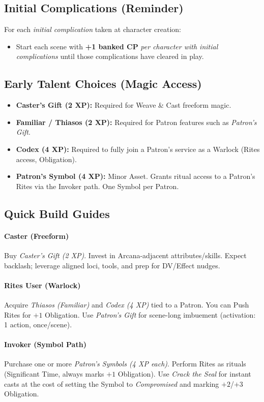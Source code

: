 \subsection{Initial Complications (Reminder)}
For each \emph{initial complication} taken at character creation:
\begin{itemize}
  \item Start each scene with \textbf{+1 banked CP} \emph{per character with initial complications} until those complications have cleared in play.
\end{itemize}

\subsection{Early Talent Choices (Magic Access)}
\begin{itemize}
  \item \textbf{Caster’s Gift (2 XP):} Required for Weave \& Cast freeform magic.
  \item \textbf{Familiar / Thiasos (2 XP):} Required for Patron features such as \emph{Patron’s Gift}.
  \item \textbf{Codex (4 XP):} Required to fully join a Patron’s service as a Warlock (Rites access, Obligation).
  \item \textbf{Patron’s Symbol (4 XP):} Minor Asset. Grants ritual access to a Patron’s Rites via the Invoker path. One Symbol per Patron.
\end{itemize}

\subsection{Quick Build Guides}
\paragraph{Caster (Freeform)}
Buy \emph{Caster’s Gift (2 XP)}. Invest in Arcana-adjacent attributes/skills. Expect backlash; leverage aligned loci, tools, and prep for DV/Effect nudges.

\paragraph{Rites User (Warlock)}
Acquire \emph{Thiasos (Familiar)} and \emph{Codex (4 XP)} tied to a Patron. You can Push Rites for $+1$ Obligation. Use \emph{Patron’s Gift} for scene-long imbuement (activation: 1 action, once/scene).

\paragraph{Invoker (Symbol Path)}
Purchase one or more \emph{Patron’s Symbols (4 XP each)}. Perform Rites as rituals (Significant Time, always marks $+1$ Obligation). Use \emph{Crack the Seal} for instant casts at the cost of setting the Symbol to \emph{Compromised} and marking $+2$/$+3$ Obligation.

